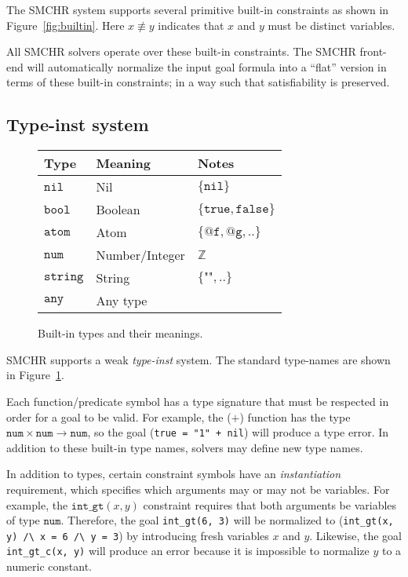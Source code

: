 \documentclass{article}
\begin{document}
The SMCHR system supports several primitive built-in constraints as
shown in Figure~\ref{fig:builtin}.
Here $x \not\equiv y$ indicates that $x$ and $y$ must be distinct variables.

All SMCHR solvers operate over these built-in constraints.
The SMCHR front-end will automatically normalize the input goal formula
into a ``flat'' version in terms of these built-in constraints; in a way
such that satisfiability is preserved.

\subsection{Type-inst system}\label{sec:types}

\begin{figure}
\begin{center}
\begin{tabular}{|l|l|l|}
\hline
Type & Meaning & Notes \\
\hline
\hline
$\mathtt{nil}$    & Nil      & $\{\texttt{nil}\}$ \\
$\mathtt{bool}$   & Boolean  & $\{\texttt{true}, \texttt{false}\}$ \\
$\mathtt{atom}$   & Atom     & $\{\texttt{@f}, \texttt{@g}, ..\}$ \\
$\mathtt{num}$    & Number/Integer & $\mathbb{Z}$ \\
$\mathtt{string}$ & String   & $\{\texttt{""}, ..\}$ \\
$\mathtt{any}$    & Any type & \\
\hline
\end{tabular}
\end{center}
\caption{Built-in types and their meanings.\label{fig:types}}
\end{figure}

SMCHR supports a weak \emph{type-inst} system.
The standard type-names are shown in Figure~\ref{fig:types}.

Each function/predicate symbol has a type signature that must be respected
in order for a goal to be valid.
For example, the ($\texttt{+}$) function has the type
$\mathtt{num} \times \mathtt{num} \rightarrow \mathtt{num}$, so the goal
(\verb-true = "1" + nil-) will produce a type error.
In addition to these built-in type names, solvers may define new type names.

In addition to types, certain constraint symbols have an
\emph{instantiation} requirement, which specifies which arguments may or
may not be variables.
For example, the $\mathtt{int\_gt}(x, y)$ constraint requires that both 
arguments be variables of type $\mathtt{num}$.
Therefore, the goal \verb-int_gt(6, 3)- will be normalized to
(\verb-int_gt(x, y) /\ x = 6 /\ y = 3-) by introducing fresh variables
$x$ and $y$.
Likewise, the goal \verb-int_gt_c(x, y)- will produce an error because
it is impossible to normalize $y$ to a numeric constant.
\end{document}
